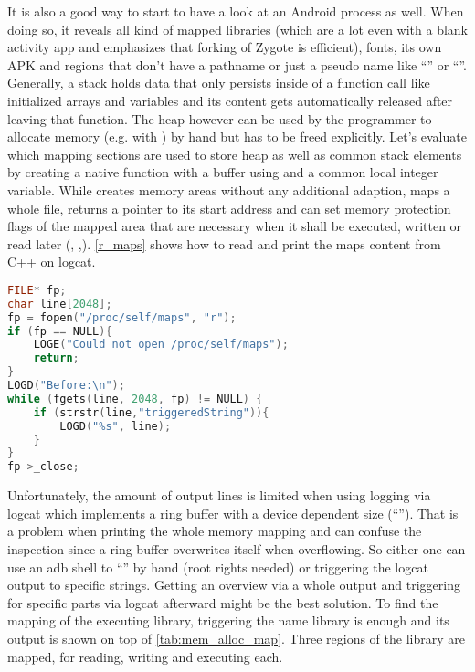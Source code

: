 It is also a good way to start to have a look at an Android process as well.
When doing so, it reveals all kind of mapped libraries (which are a lot even 
with a blank activity app and emphasizes that forking of Zygote is efficient), fonts, its own APK and regions that don't have a pathname or just a pseudo name like
``'' or ``\code{[stack]}''. Generally, a stack holds
data that only persists inside of a function call like initialized arrays and
variables and its content gets automatically released after leaving that function.
The heap however can be used by the programmer to allocate memory
(e.g. with ) by hand but has to be freed explicitly.
Let's evaluate which mapping sections are used to store heap as well as common stack
elements by creating a native function with a buffer using 
and a common local integer variable. While  creates memory areas
without any additional adaption,  maps a whole file, returns a pointer
to its start address and can set memory protection flags of the mapped area that
are necessary when it shall be executed, written or read later (,
 ,).
\autoref{r_maps} shows how to read and print the maps content from C++ on logcat.
\begin{lstlisting}[language=C++, caption=Reading /proc/self/maps, label=r_maps]
FILE* fp;
char line[2048];
fp = fopen("/proc/self/maps", "r");
if (fp == NULL){
    LOGE("Could not open /proc/self/maps");
    return;
}
LOGD("Before:\n");
while (fgets(line, 2048, fp) != NULL) {
    if (strstr(line,"triggeredString")){
        LOGD("%s", line);
    }
}
fp->_close;
\end{lstlisting}
Unfortunately, the amount of output lines is limited when using logging via logcat which
implements a ring buffer with a device dependent size (``''). That
is a problem when printing the whole memory mapping and can confuse the inspection 
since a ring buffer overwrites itself when overflowing. So either one can use an
adb shell to ``'' by hand (root rights needed)
or triggering the logcat output to specific strings. Getting an overview via a whole output and triggering for specific parts via logcat afterward might be the best solution. 
To find the mapping of the executing library, triggering the name library is enough
and its output is shown on top of \autoref{tab:mem_alloc_map}. Three regions
of the library are mapped, for reading, writing and executing each.
